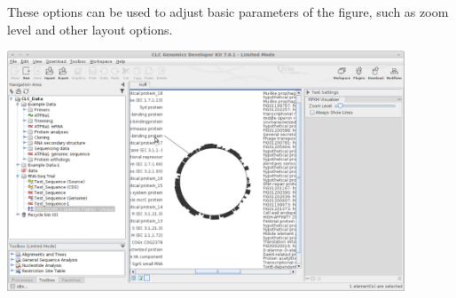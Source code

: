 \documentclass[12pt,letterpaper]{article}
\begin{document}
These options can be used to adjust basic parameters of the figure, such as
zoom level and other layout options.

\begin{center}
    \includegraphics[width=32em]{sidebar-changed.png}
\end{center}
\end{document}
